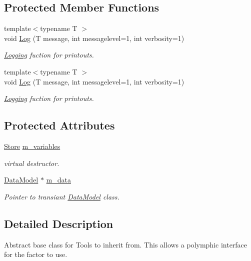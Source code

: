 \subsection*{Protected Member Functions}
\begin{DoxyCompactItemize}
\item 
{\footnotesize template$<$typename T $>$ }\\void \hyperlink{classTool_a46f7e599888302feefcf25e4f6cb4f9e}{Log} (T message, int messagelevel=1, int verbosity=1)
\begin{DoxyCompactList}\small\item\em \hyperlink{classLogging}{Logging} fuction for printouts. \end{DoxyCompactList}\item 
{\footnotesize template$<$typename T $>$ }\\void \hyperlink{classTool_a46f7e599888302feefcf25e4f6cb4f9e}{Log} (T message, int messagelevel=1, int verbosity=1)
\begin{DoxyCompactList}\small\item\em \hyperlink{classLogging}{Logging} fuction for printouts. \end{DoxyCompactList}\end{DoxyCompactItemize}
\subsection*{Protected Attributes}
\begin{DoxyCompactItemize}
\item 
\hyperlink{classStore}{Store} \hyperlink{classTool_a208aed50c1c50212d2927b372c38763f}{m\-\_\-variables}
\begin{DoxyCompactList}\small\item\em virtual destructor. \end{DoxyCompactList}\item 
\hypertarget{classTool_a0c166968759706b4cd07466693cf19d0}{\hyperlink{classDataModel}{Data\-Model} $\ast$ \hyperlink{classTool_a0c166968759706b4cd07466693cf19d0}{m\-\_\-data}}\label{classTool_a0c166968759706b4cd07466693cf19d0}

\begin{DoxyCompactList}\small\item\em Pointer to transiant \hyperlink{classDataModel}{Data\-Model} class. \end{DoxyCompactList}\end{DoxyCompactItemize}


\subsection{Detailed Description}
Abstract base class for Tools to inherit from. This allows a polymphic interface for the factor to use.

